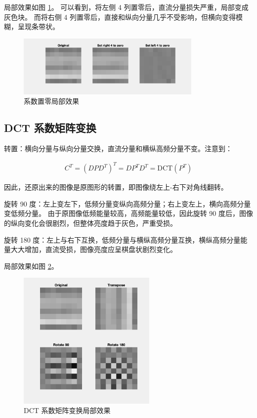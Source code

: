 \documentclass[a4paper]{article}  %
\begin{document}
局部效果如图 \ref{fig:2_3_patch}。
可以看到，将左侧 4 列置零后，直流分量损失严重，局部变成灰色块。
而将右侧 4 列置零后，直接和纵向分量几乎不受影响，但横向变得模糊，呈现条带状。

\begin{figure}[ht]
    \centering
    \includegraphics[width=0.8\textwidth]{asserts/2_3_patch.png}
    \caption{
        系数置零局部效果
    }\label{fig:2_3_patch}
\end{figure}

\subsection{DCT 系数矩阵变换}

转置：横向分量与纵向分量交换，直流分量和横纵高频分量不变。注意到：

\begin{align*}
C^T = (DPD^T)^T = DP^TD^T = \text{DCT}(P^T)
\end{align*}

因此，还原出来的图像是原图形的转置，即图像绕左上-右下对角线翻转。

旋转 90 度：左上变左下，低频分量变纵向高频分量；右上变左上，横向高频分量变低频分量。
由于原图像低频能量较高，高频能量较低，因此旋转 90 度后，图像的纵向变化会很剧烈，但整体亮度趋于灰色，严重受损。

旋转 180 度：左上与右下互换，低频分量与横纵高频分量互换，横纵高频分量能量大大增加，直流受损，图像亮度应呈棋盘状剧烈变化。

局部效果如图 \ref{fig:2_4_patch}。

\begin{figure}[ht]
    \centering
    \includegraphics[width=0.6\textwidth]{asserts/2_4_patch.png}
    \caption{
        DCT 系数矩阵变换局部效果
    }\label{fig:2_4_patch}
\end{figure}
\end{document}
